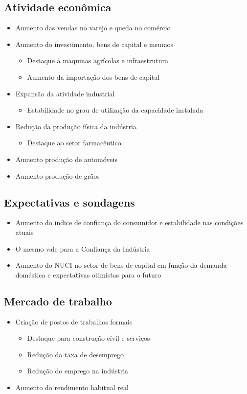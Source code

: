 \documentclass[11pt]{article}
\begin{document}
\subsection*{Atividade econômica}
\label{sec:org0ed17f3}
\begin{itemize}
\item Aumento das vendas no varejo e queda no comércio
\item Aumento do investimento, bens de capital e insumos
\begin{itemize}
\item Destaque à maquinas agrícolas e infraestrutura
\item Aumento da importação dos bens de capital
\end{itemize}
\item Expansão da atividade industrial
\begin{itemize}
\item Estabilidade no grau de utilização da capacidade instalada
\end{itemize}
\item Redução da produção física da indústria
\begin{itemize}
\item Destaque ao setor farmacêutico
\end{itemize}
\item Aumento produção de automóveis
\item Aumento produção de grãos
\end{itemize}
\subsection*{Expectativas e sondagens}
\label{sec:org8406c9c}
\begin{itemize}
\item Aumento do índice de confiança do consumidor e estabilidade nas condições atuais
\item O mesmo vale para a Confiança da Indústria
\item Aumento do NUCI no setor de bens de capital em função da demanda doméstica e expectativas otimistas para o futuro
\end{itemize}
\subsection*{Mercado de trabalho}
\label{sec:orge3cf96b}
\begin{itemize}
\item Criação de postos de trabalhos formais
\begin{itemize}
\item Destaque para construção cívil e serviços
\item Redução da taxa de desemprego
\item Redução do emprego na indústria
\end{itemize}
\item Aumento do rendimento habitual real
\end{itemize}
\end{document}
